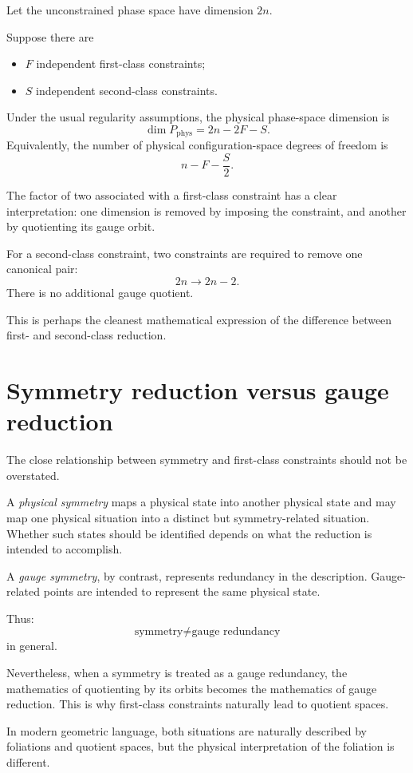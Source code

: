 \documentclass[11pt,a4paper]{article}
\theoremstyle{definition}
\begin{document}
Let the unconstrained phase space have dimension $2n$.

Suppose there are
\begin{itemize}
\item $F$ independent first-class constraints;
\item $S$ independent second-class constraints.
\end{itemize}
Under the usual regularity assumptions, the physical phase-space dimension is
\[
        \boxed{
        \dim P_{\mathrm{phys}}
        =
        2n-2F-S.
        }
\]
Equivalently, the number of physical configuration-space degrees of freedom is
\[
        \boxed{
        n-F-\frac{S}{2}.
        }
\]

The factor of two associated with a first-class constraint has a clear
interpretation:
one dimension is removed by imposing the constraint, and another by
quotienting its gauge orbit.

For a second-class constraint, two constraints are required to remove one
canonical pair:
\[
        2n\longrightarrow 2n-2.
\]
There is no additional gauge quotient.

This is perhaps the cleanest mathematical expression of the difference between
first- and second-class reduction.

\section{Symmetry reduction versus gauge reduction}

The close relationship between symmetry and first-class constraints should not
be overstated.

A \emph{physical symmetry} maps a physical state into another physical state
and may map one physical situation into a distinct but symmetry-related
situation.  Whether such states should be identified depends on what the
reduction is intended to accomplish.

A \emph{gauge symmetry}, by contrast, represents redundancy in the
description.  Gauge-related points are intended to represent the same
physical state.

Thus:
\[
        \text{symmetry} \neq \text{gauge redundancy}
\]
in general.

Nevertheless, when a symmetry is treated as a gauge redundancy, the
mathematics of quotienting by its orbits becomes the mathematics of gauge
reduction.  This is why first-class constraints naturally lead to quotient
spaces.

In modern geometric language, both situations are naturally described by
foliations and quotient spaces, but the physical interpretation of the
foliation is different.
\end{document}

